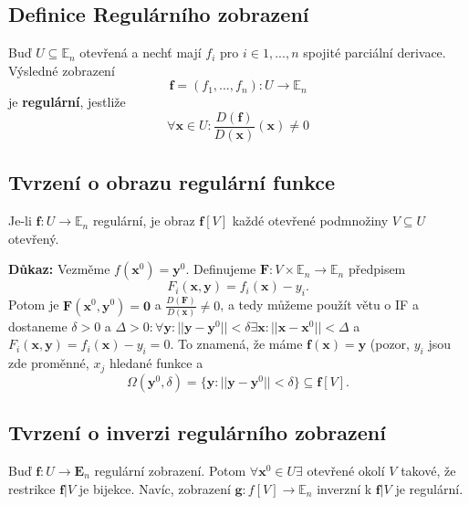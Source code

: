 \documentclass[../main.tex]{subfiles}
\begin{document}
\subsection{Definice Regulárního zobrazení}
\hspace{1.2mm}
\noindent
Buď $U \subseteq \mathbb{E}_n$ otevřená a nechť mají $f_i$ pro $i \in {1, ... , n}$
spojité parciální derivace. Výsledné zobrazení
\[ \mathbf{f} = (f_1, ... , f_n): U \to \mathbb{E}_n \]
je \textbf{regulární}, jestliže
\[ \forall \mathbf{x} \in U: \frac{D(\mathbf{f})}{D(\mathbf{x})}(\mathbf{x}) \neq 0 \]


\subsection{Tvrzení o obrazu regulární funkce}
\hspace{1.2mm}
\noindent
Je-li $\mathbf{f}: U \to \mathbb{E}_n$ regulární, je obraz $\mathbf{f}[V]$ každé otevřené podmnožiny
$V \subseteq U$ otevřený.

\vspace{5mm}
\noindent
\textbf{Důkaz:} Vezměme $f(\textbf{x}^0) = \textbf{y}^0.$ Definujeme $\textbf{F} : V \times \mathbb{E}_n \rightarrow \mathbb{E}_n$ předpisem
\[F_i(\textbf{x},\textbf{y}) = f_i(\textbf{x}) - y_i.\]
Potom je $\textbf{F}(\textbf{x}^0,\textbf{y}^0) = \textbf{0}$
a $\frac{D(\textbf{F})}{D(\textbf{x})} \neq 0$, 
a tedy můžeme použít větu o IF a dostaneme 
$\delta > 0$ a $\Delta > 0 : \forall \textbf{y} : ||\textbf{y} - \textbf{y}^0|| < \delta \exists \textbf{x} : ||\textbf{x} - \textbf{x}^0|| < \Delta$ a 
$F_i(\textbf{x},\textbf{y}) = f_i(\textbf{x}) - y_i = 0$. To znamená, že máme $\textbf{f}(\textbf{x}) = \textbf{y}$ (pozor, $y_i$ jsou zde proměnné, $x_j$ hledané funkce a
\[\Omega(\textbf{y}^0,\delta) = \{\textbf{y} : ||\textbf{y} - \textbf{y}^0 || < \delta \} \subseteq \textbf{f}[V].\]

\subsection{Tvrzení o inverzi regulárního zobrazení}
\hspace{1.2mm}
\noindent
Buď $\mathbf{f}: U \to \mathbf{E}_n$ regulární zobrazení. Potom $\forall \mathbf{x}^0 \in U \exists$
otevřené okolí $V$ takové, že restrikce $\mathbf{f}|V$ je bijekce. Navíc, zobrazení
$\mathbf{g}: f[V] \to \mathbb{E}_n$ inverzní k $\mathbf{f}|V$ je regulární.
\end{document}
